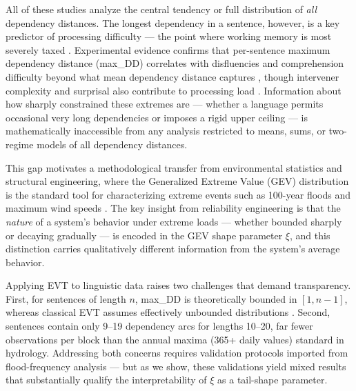 \documentclass[11pt,letterpaper]{article}
\begin{document}
All of these studies analyze the central tendency or full distribution of \emph{all} dependency distances. The longest dependency in a sentence, however, is a key predictor of processing difficulty --- the point where working memory is most severely taxed \cite{Liu2017, Liu2008}. Experimental evidence confirms that per-sentence maximum dependency distance (max\_DD) correlates with disfluencies and comprehension difficulty beyond what mean dependency distance captures \cite{Liu2017}, though intervener complexity and surprisal also contribute to processing load \cite{Yadav2022}. Information about how sharply constrained these extremes are --- whether a language permits occasional very long dependencies or imposes a rigid upper ceiling --- is mathematically inaccessible from any analysis restricted to means, sums, or two-regime models of all dependency distances.

This gap motivates a methodological transfer from environmental statistics and structural engineering, where the Generalized Extreme Value (GEV) distribution is the standard tool for characterizing extreme events such as 100-year floods and maximum wind speeds \cite{Coles2001, Hosking1997}. The key insight from reliability engineering is that the \emph{nature} of a system's behavior under extreme loads --- whether bounded sharply or decaying gradually --- is encoded in the GEV shape parameter $\xi$, and this distinction carries qualitatively different information from the system's average behavior.

Applying EVT to linguistic data raises two challenges that demand transparency. First, for sentences of length $n$, max\_DD is theoretically bounded in $[1, n{-}1]$, whereas classical EVT assumes effectively unbounded distributions \cite{Coles2001}. Second, sentences contain only 9--19 dependency arcs for lengths 10--20, far fewer observations per block than the annual maxima (365+ daily values) standard in hydrology. Addressing both concerns requires validation protocols imported from flood-frequency analysis \cite{Coles2001, Hosking1997} --- but as we show, these validations yield mixed results that substantially qualify the interpretability of $\xi$ as a tail-shape parameter.
\end{document}

